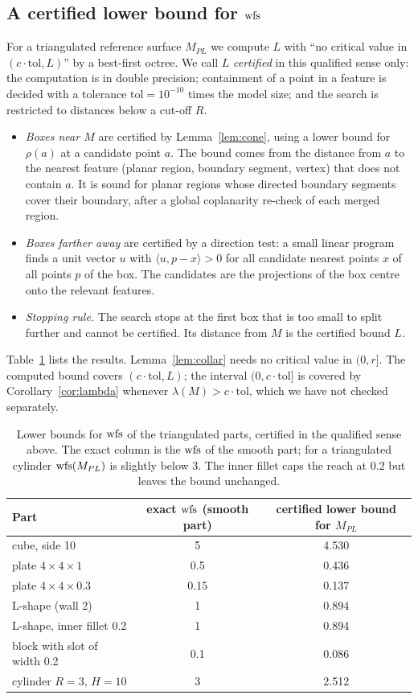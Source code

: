 \subsection{A certified lower bound for $\operatorname{wfs}$}
For a triangulated reference surface $M_{PL}$ we compute $L$ with ``no critical value in $(c\cdot\mathrm{tol},L)$''
by a best-first octree. We call $L$ \emph{certified} in this qualified sense only: the computation is in double
precision; containment of a point in a feature is decided with a tolerance $\mathrm{tol}=10^{-10}$ times the model
size; and the search is restricted to distances below a cut-off $R$.
\begin{itemize}
\item \emph{Boxes near $M$} are certified by Lemma~\ref{lem:cone}, using a lower bound for $\rho(a)$ at a
candidate point $a$. The bound comes from the distance from $a$ to the nearest feature (planar region, boundary
segment, vertex) that does not contain $a$. It is sound for planar regions whose directed boundary segments cover
their boundary, after a global coplanarity re-check of each merged region.
\item \emph{Boxes farther away} are certified by a direction test: a small linear program finds a unit vector $u$
with $\langle u,p-x\rangle>0$ for all candidate nearest points $x$ of all points $p$ of the box. The candidates
are the projections of the box centre onto the relevant features.
\item \emph{Stopping rule.} The search stops at the first box that is too small to split further and cannot be
certified. Its distance from $M$ is the certified bound $L$.
\end{itemize}
Table~\ref{tab:wfs} lists the results. Lemma~\ref{lem:collar} needs no critical value in $(0,r]$. The computed
bound covers $(c\cdot\mathrm{tol},L)$; the interval $(0,c\cdot\mathrm{tol}]$ is covered by
Corollary~\ref{cor:lambda} whenever $\lambda(M)>c\cdot\mathrm{tol}$, which we have not checked separately.

\begin{table}[h]
\centering
\begin{tabular}{lcc}
\toprule
Part & exact $\operatorname{wfs}$ (smooth part) & certified lower bound for $M_{PL}$ \\
\midrule
cube, side 10 & 5 & 4.530 \\
plate $4\times4\times1$ & 0.5 & 0.436 \\
plate $4\times4\times0.3$ & 0.15 & 0.137 \\
L-shape (wall 2) & 1 & 0.894 \\
L-shape, inner fillet 0.2 & 1 & 0.894 \\
block with slot of width 0.2 & 0.1 & 0.086 \\
cylinder $R=3$, $H=10$ & 3 & 2.512 \\
\bottomrule
\end{tabular}
\caption{Lower bounds for $\operatorname{wfs}$ of the triangulated parts, certified in the qualified sense above. The exact
column is the $\operatorname{wfs}$ of the smooth part; for a triangulated cylinder $\operatorname{wfs}(M_{PL})$ is slightly below $3$. The inner
fillet caps the reach at $0.2$ but leaves the bound unchanged.}\label{tab:wfs}
\end{table}

